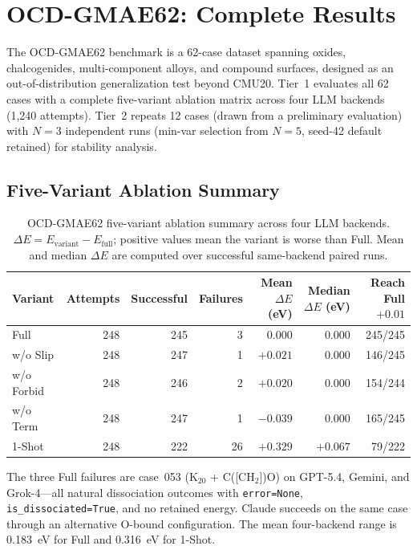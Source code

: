 \documentclass[%
 preprint,
 superscriptaddress,
 amsmath,amssymb,
 aps,
 prb,
 floatfix,
]{revtex4-2}
\begin{document}

\section{OCD-GMAE62: Complete Results}

The OCD-GMAE62 benchmark is a 62-case dataset spanning oxides, chalcogenides, multi-component alloys, and compound surfaces, designed as an out-of-distribution generalization test beyond CMU20.
Tier~1 evaluates all 62 cases with a complete five-variant ablation matrix across four LLM backends (1{,}240 attempts).
Tier~2 repeats 12 cases (drawn from a preliminary evaluation) with $N=3$ independent runs (min-var selection from $N=5$, seed-42 default retained) for stability analysis.

\subsection{Five-Variant Ablation Summary}

\begin{table}[ht]
\centering
\scriptsize
\caption{OCD-GMAE62 five-variant ablation summary across four LLM backends. $\Delta E = E_{\mathrm{variant}} - E_{\mathrm{full}}$; positive values mean the variant is worse than Full. Mean and median $\Delta E$ are computed over successful same-backend paired runs.}
\label{tab:si-ocd62-ablation-summary}
\begin{tabular}{lrrrrrr}
\toprule
Variant & Attempts & Successful & Failures & Mean $\Delta E$ (eV) & Median $\Delta E$ (eV) & Reach Full$+0.01$ \\
\midrule
Full & 248 & 245 & 3 & 0.000 & 0.000 & 245/245 \\
w/o Slip & 248 & 247 & 1 & $+0.021$ & 0.000 & 146/245 \\
w/o Forbid & 248 & 246 & 2 & $+0.020$ & 0.000 & 154/244 \\
w/o Term & 248 & 247 & 1 & $-0.039$ & 0.000 & 165/245 \\
1-Shot & 248 & 222 & 26 & $+0.329$ & $+0.067$ & 79/222 \\
\bottomrule
\end{tabular}
\end{table}

The three Full failures are case~053 (K$_{20}$ + C([CH$_2$])O) on GPT-5.4, Gemini, and Grok-4---all natural dissociation outcomes with \texttt{error=None}, \texttt{is\_dissociated=True}, and no retained energy. Claude succeeds on the same case through an alternative O-bound configuration. The mean four-backend range is 0.183~eV for Full and 0.316~eV for 1-Shot.
\end{document}
